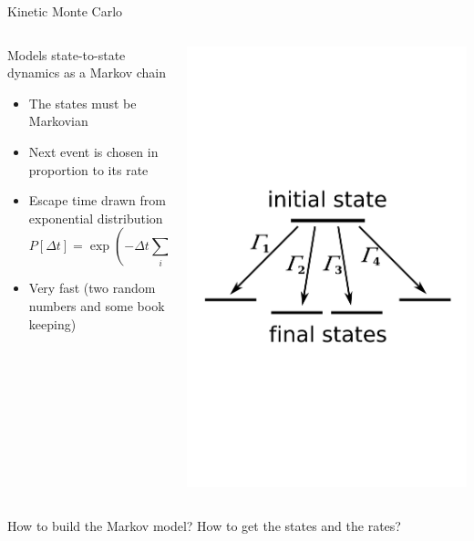 \documentclass[onlymath]{beamer}
\begin{document}
\begin{frame}{Kinetic Monte Carlo}

\begin{columns}[T]

\begin{column}{0.7\textwidth}
 Models state-to-state dynamics as a Markov chain
  \begin{itemize}
    \item The states must be Markovian
    \item Next event is chosen in proportion to its rate
    \item Escape time drawn from exponential distribution
      \[ P\left[\Delta t\right] = \exp \left( -\Delta t \sum_i \Gamma_i \right) \]
     \item Very fast (two random numbers and some book keeping)
  \end{itemize}
\end{column}

\begin{column}{0.3\textwidth}
	\includegraphics[width=\columnwidth]{images/kmc.pdf}
\end{column}

\end{columns}
\vspace{5mm}
How to build the Markov model? How to get the states and the rates?

\end{frame}
\end{document}
